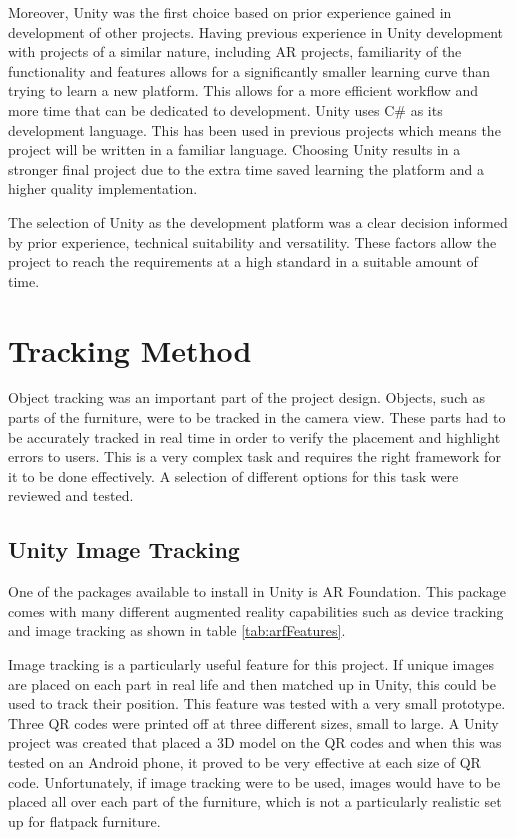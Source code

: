 \documentclass{l4proj}
\begin{document}
Moreover, Unity was the first choice based on prior experience gained in development of other projects. Having previous experience in Unity development with projects of a similar nature, including AR projects, familiarity of the functionality and features allows for a significantly smaller learning curve than trying to learn a new platform. This allows for a more efficient workflow and more time that can be dedicated to development. Unity uses C\# as its development language. This has been used in previous projects which means the project will be written in a familiar language. Choosing Unity results in a stronger final project due to the extra time saved learning the platform and a higher quality implementation.

The selection of Unity as the development platform was a clear decision informed by prior experience, technical suitability and versatility. These factors allow the project to reach the requirements at a high standard in a suitable amount of time.

\section{Tracking Method}

Object tracking was an important part of the project design. Objects, such as parts of the furniture, were to be tracked in the camera view. These parts had to be accurately tracked in real time in order to verify the placement and highlight errors to users. This is a very complex task and requires the right framework for it to be done effectively. A selection of different options for this task were reviewed and tested.

\subsection{Unity Image Tracking}

One of the packages available to install in Unity is AR Foundation. This package comes with many different augmented reality capabilities such as device tracking and image tracking as shown in table \ref{tab:arfFeatures}. 

Image tracking is a particularly useful feature for this project. If unique images are placed on each part in real life and then matched up in Unity, this could be used to track their position. This feature was tested with a very small prototype. Three QR codes were printed off at three different sizes, small to large. A Unity project was created that placed a 3D model on the QR codes and when this was tested on an Android phone, it proved to be very effective at each size of QR code. Unfortunately, if image tracking were to be used, images would have to be placed all over each part of the furniture, which is not a particularly realistic set up for flatpack furniture.
\end{document}
